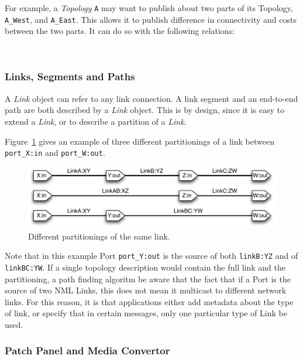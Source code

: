 For example, a \emph{Topology} \texttt{A} may want to publish about two parts of its Topology, \texttt{A\_West}, and \texttt{A\_East}. This allows it to publish difference in connectivity and costs between the two parts. It can do so with the following relations:

\\

\subsubsection{Links, Segments and Paths}

A \emph{Link} object can refer to any link connection. A link segment and an end-to-end path are both described by a \emph{Link} object. This is by design, since it is easy to extend a \emph{Link}, or to describe a partition of a \emph{Link}.

Figure~\ref{fig:compound-link} gives an example of three different partitionings of a link between \texttt{port\_X:in} and \texttt{port\_W:out}.

\begin{figure}[htb]
    \centering
        \includegraphics[width=.8\textwidth]{compound-link.pdf}
    \caption{Different partitionings of the same link.}
    \label{fig:compound-link}
\end{figure}

Note that in this example Port \texttt{port\_Y:out} is the source of both \texttt{linkB:YZ} and of \texttt{linkBC:YW}. If a single topology description would contain the full link and the partitioning, a path finding algoritm \MUST{} be aware that the fact that if a Port is the source of two NML Links, this does not mean it multicast to different network links. For this reason, it is \RECOMMENDED{} that applications either add metadata about the type of link, or specify that in certain messages, only one particular type of Link \MUST{} be used.


\subsubsection{Patch Panel and Media Convertor}

